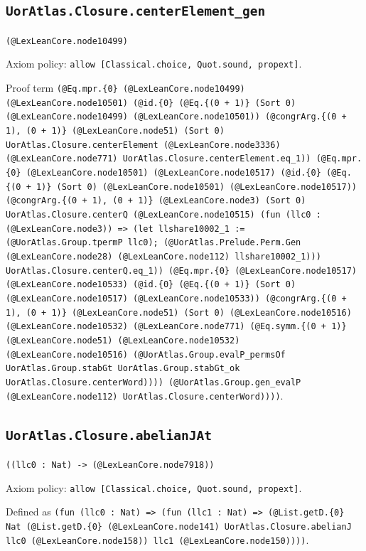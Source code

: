 \documentclass[11pt]{article}
\begin{document}
\subsection*{\texttt{UorAtlas.Closure.centerElement\_gen}}
\noindent\texttt{(@LexLeanCore.node10499)}\par
\noindent Axiom policy: \texttt{allow [Classical.choice, Quot.sound, propext]}.\par
\noindent Proof term \texttt{(@Eq.mpr.\{0\} (@LexLeanCore.node10499) (@LexLeanCore.node10501) (@id.\{0\} (@Eq.\{(0 + 1)\} (Sort 0) (@LexLeanCore.node10499) (@LexLeanCore.node10501)) (@congrArg.\{(0 + 1), (0 + 1)\} (@LexLeanCore.node51) (Sort 0) UorAtlas.Closure.centerElement (@LexLeanCore.node3336) (@LexLeanCore.node771) UorAtlas.Closure.centerElement.eq\_1)) (@Eq.mpr.\{0\} (@LexLeanCore.node10501) (@LexLeanCore.node10517) (@id.\{0\} (@Eq.\{(0 + 1)\} (Sort 0) (@LexLeanCore.node10501) (@LexLeanCore.node10517)) (@congrArg.\{(0 + 1), (0 + 1)\} (@LexLeanCore.node3) (Sort 0) UorAtlas.Closure.centerQ (@LexLeanCore.node10515) (fun (llc0 : (@LexLeanCore.node3)) => (let llshare10002\_1 := (@UorAtlas.Group.tpermP llc0); (@UorAtlas.Prelude.Perm.Gen (@LexLeanCore.node28) (@LexLeanCore.node112) llshare10002\_1))) UorAtlas.Closure.centerQ.eq\_1)) (@Eq.mpr.\{0\} (@LexLeanCore.node10517) (@LexLeanCore.node10533) (@id.\{0\} (@Eq.\{(0 + 1)\} (Sort 0) (@LexLeanCore.node10517) (@LexLeanCore.node10533)) (@congrArg.\{(0 + 1), (0 + 1)\} (@LexLeanCore.node51) (Sort 0) (@LexLeanCore.node10516) (@LexLeanCore.node10532) (@LexLeanCore.node771) (@Eq.symm.\{(0 + 1)\} (@LexLeanCore.node51) (@LexLeanCore.node10532) (@LexLeanCore.node10516) (@UorAtlas.Group.evalP\_permsOf UorAtlas.Group.stabGt UorAtlas.Group.stabGt\_ok UorAtlas.Closure.centerWord)))) (@UorAtlas.Group.gen\_evalP (@LexLeanCore.node112) UorAtlas.Closure.centerWord))))}.\par
\subsection*{\texttt{UorAtlas.Closure.abelianJAt}}
\noindent\texttt{((llc0 : Nat) -> (@LexLeanCore.node7918))}\par
\noindent Axiom policy: \texttt{allow [Classical.choice, Quot.sound, propext]}.\par
\noindent Defined as \texttt{(fun (llc0 : Nat) => (fun (llc1 : Nat) => (@List.getD.\{0\} Nat (@List.getD.\{0\} (@LexLeanCore.node141) UorAtlas.Closure.abelianJ llc0 (@LexLeanCore.node158)) llc1 (@LexLeanCore.node150))))}.\par
\end{document}
